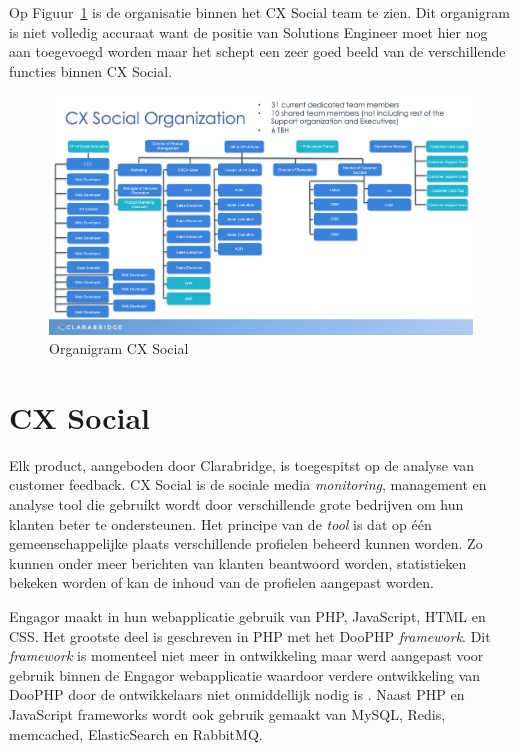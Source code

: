 Op Figuur~\ref{fig:Organigram} is de organisatie binnen het CX Social team te zien. Dit organigram is niet volledig accuraat want de positie van Solutions Engineer moet hier nog aan toegevoegd worden maar het schept een zeer goed beeld van de verschillende functies binnen CX Social. 

\begin{figure}[H]
	\centering
	\includegraphics[width=1\textwidth]{Figuren/Organigram.png}
	\caption{Organigram CX Social} %
	\label{fig:Organigram}
\end{figure} 

\section{CX Social}
Elk product, aangeboden door Clarabridge, is toegespitst op de analyse van customer feedback. CX Social is de sociale media \textit{monitoring}, management en analyse tool die gebruikt wordt door verschillende grote bedrijven om hun klanten beter te ondersteunen. Het principe van de \textit{tool} is dat op \'{e}\'{e}n gemeenschappelijke plaats verschillende profielen beheerd kunnen worden. Zo kunnen onder meer berichten van klanten beantwoord worden, statistieken bekeken worden of kan de inhoud van de profielen aangepast worden. 

Engagor maakt in hun webapplicatie gebruik van PHP, JavaScript, HTML en CSS. Het grootste deel is geschreven in PHP met het DooPHP \textit{framework}. Dit \textit{framework} is momenteel niet meer in ontwikkeling maar werd aangepast voor gebruik binnen de Engagor webapplicatie waardoor verdere ontwikkeling van DooPHP door de ontwikkelaars niet onmiddellijk nodig is \cite{DooPHP}. Naast PHP en JavaScript frameworks wordt ook gebruik gemaakt van MySQL, Redis, memcached, ElasticSearch en RabbitMQ. 

